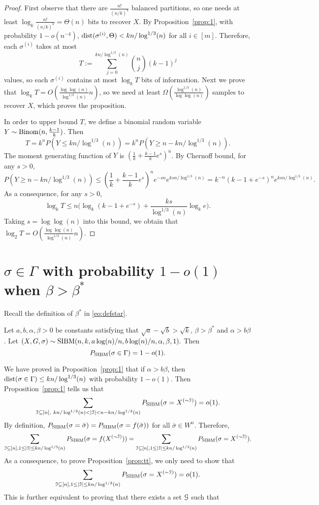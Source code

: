 \documentclass{article}
\begin{document}
\begin{proof}
First observe that there are $\frac{n!}{(n/k)^k}$ balanced partitions, so one needs at least $\log_k \frac{n!}{(n/k)^k}=\Theta(n)$ bits to recover $X$.
By Proposition~\ref{prop:1}, with probability $1-o(n^{-4})$, $\operatorname{dist}(\sigma^{(i)}, \Theta)< kn/\log^{1/3}(n)$
for all $i\in[m]$. Therefore, each $\sigma^{(i)}$ takes at most
$$
T:=\sum_{j=0}^{kn/\log^{1/3}(n)} \binom{n}{j}(k-1)^j
$$
values, so each $\sigma^{(i)}$ contains at most $\log_k T$ bits of information. Next we prove that $\log_k T=O(\frac{\log\log(n)}{\log^{1/3}(n)} n)$, so we need at least $\Omega(\frac{\log^{1/3}(n)}{\log\log(n)})$ samples to recover $X$, which proves the proposition.

In order to upper bound $T$, we define a binomial random variable $Y\sim\operatorname{Binom}(n,\frac{k-1}{k})$. Then
$$
T=k^n P(Y\le kn/\log^{1/3}(n))
= k^n P(Y\ge n- kn/\log^{1/3}(n)).
$$
The moment generating function of $Y$ is $(\frac{1}{k}+\frac{k-1}{k}e^s)^n$. By Chernoff bound, for any $s>0$,
$$
P(Y\ge n- kn/\log^{1/3}(n)) \le
(\frac{1}{k}+\frac{k-1}{k}e^s)^n e^{-sn}
e^{ksn/\log^{1/3}(n)}
= k^{-n} (k-1+e^{-s})^n e^{ksn/\log^{1/3}(n)} .
$$
As a consequence, for any $s>0$,
$$
\log_k T\le n\Big(\log_k(k-1+e^{-s})
+\frac{ks}{\log^{1/3}(n)}\log_k e \Big) .
$$
Taking $s=\log\log(n)$ into this bound, we obtain that $\log_2 T=O(\frac{\log\log(n)}{\log^{1/3}(n)} n)$.
\end{proof}

\section{$\sigma \in \Gamma$ with probability $1-o(1)$ when $\beta>\beta^\ast$} \label{sect:equal}

Recall the definition of $\beta^\ast$ in \eqref{eq:defstar}.
\begin{proposition} \label{prop:tt}
Let $a,b,\alpha,\beta> 0$ be constants satisfying that $\sqrt{a}-\sqrt{b} > \sqrt{k}$, $\beta>\beta^\ast$ and $\alpha>b\beta$. 
Let 
$
(X,G,\sigma) \sim \operatorname{SIBM}(n,k, a\log(n)/n, b\log(n)/n,\alpha,\beta, 1) .
$
Then
$$
P_{\operatorname{SIBM}}(\sigma \in \Gamma)=1-o(1) .
$$
\end{proposition}

We have proved in Proposition~\ref{prop:1} that if $\alpha>b\beta$, then $\operatorname{dist}(\sigma \in \Gamma) \le kn/\log^{1/3}(n)$
 with probability $1-o(1)$.
Then Proposition~\ref{prop:1} tells us that
$$
\sum_{\cI\subseteq[n],~
kn/\log^{1/3}(n)<|\cI|<n-kn/\log^{1/3}(n)} P_{\SIBM}(\sigma=X^{(\sim\cI)})  = o(1) .
$$
By definition, $P_{\operatorname{SIBM}}(\sigma=\bar{\sigma})=P_{\operatorname{SIBM}}(\sigma=f(\bar{\sigma}))$ for all $\bar{\sigma}\in W^n$. Therefore, 
$$
\sum_{\mathcal{I}\subseteq[n],1\le |\mathcal{I}|\le kn/\log^{1/3}(n)} P_{\operatorname{SIBM}}(\sigma=f(X^{(\sim\mathcal{I})})) =\sum_{\mathcal{I}\subseteq[n],1\le |\mathcal{I}|\le kn/\log^{1/3}(n)} P_{\operatorname{SIBM}}(\sigma=X^{(\sim\mathcal{I})}).
$$
As a consequence, to prove Proposition~\ref{prop:tt}, we only need to show that
$$
\sum_{\mathcal{I}\subseteq[n],1\le |\mathcal{I}|\le kn/\log^{1/3}(n)} P_{\operatorname{SIBM}}(\sigma=X^{(\sim\mathcal{I})}) 
= o(1) .
$$
This is further equivalent to proving that there exists a set $\mathcal{G}$ such that
\end{document}
